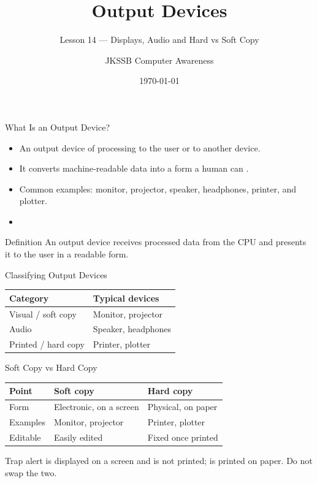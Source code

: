 \documentclass[aspectratio=169]{beamer}
\title{Output Devices}
\subtitle{Lesson 14 --- Displays, Audio and Hard vs Soft Copy}
\author{JKSSB Computer Awareness}
\date{\today}
\begin{document}
\frame{\titlepage}

\begin{frame}{What Is an Output Device?}
  \begin{itemize}
    \item An output device  of processing to the user
      or to another device.
    \item It converts machine-readable data into a form a human can
      .
    \item Common examples: monitor, projector, speaker, headphones, printer,
      and plotter.
    \item {}
  \end{itemize}
  \begin{block}{Definition}
    An output device receives processed data from the CPU and presents it to
    the user in a readable form.
  \end{block}
\end{frame}

\begin{frame}{Classifying Output Devices}
  \begin{center}
    \begin{tabular}{p{}p{}}
      \toprule
      \textbf{Category} & \textbf{Typical devices} \\
      \midrule
      Visual / soft copy & Monitor, projector \\
      Audio & Speaker, headphones \\
      Printed / hard copy & Printer, plotter \\
      \bottomrule
    \end{tabular}
  \end{center}
  \vspace{0.2cm}
\end{frame}

\begin{frame}{Soft Copy vs Hard Copy}
  \begin{center}
    \begin{tabular}{p{}p{}p{}}
      \toprule
      \textbf{Point} & \textbf{Soft copy} & \textbf{Hard copy} \\
      \midrule
      Form & Electronic, on a screen & Physical, on paper \\
      Examples & Monitor, projector & Printer, plotter \\
      Editable & Easily edited & Fixed once printed \\
      \bottomrule
    \end{tabular}
  \end{center}
  \vspace{0.25cm}
  \begin{alertblock}{Trap alert}
     is displayed on a screen and is not printed;
     is printed on paper. Do not swap the two.
  \end{alertblock}
\end{frame}
\end{document}
